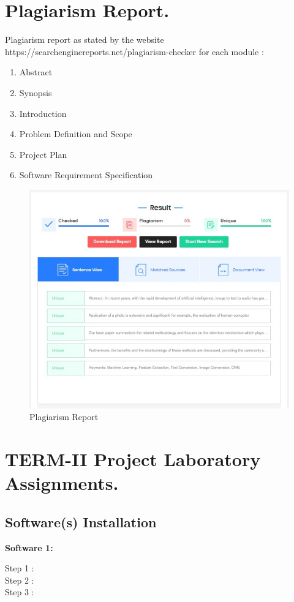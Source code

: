 \documentclass{report} %
\begin{document}
\begin{appendices}
	\chapter{Plagiarism Report.}
	\pagebreak
	\vspace*{0.5cm}
	Plagiarism report as stated by the website https://searchenginereports.net/plagiarism-checker for each module :
		
		\begin{enumerate}
			\item Abstract
			\item Synopsis
			\item Introduction
			\item Problem Definition and Scope
			\item Project Plan
			\item Software Requirement Specification
		\end{enumerate}
		
		\begin{figure}[h]
			\centering
			\includegraphics{images/plagiarism report.jpg}
			\caption{Plagiarism Report}
		\end{figure}		
		
		\chapter{TERM-II Project Laboratory Assignments.}
		\pagebreak
		\vspace*{0.5cm}
		\section{Software(s) Installation}
		\textbf{Software  1:}
		\begin{description}
			\item [Step 1 :] 
			\item [Step 2 :] 
			\item [Step 3 :] 
		\end{description}
		\vspace{\baselineskip}
		

\end{appendices}
\end{document}
